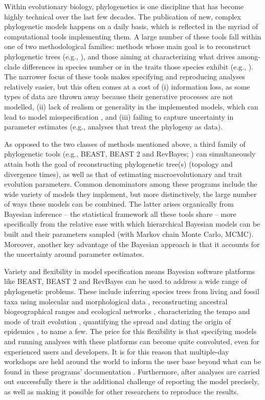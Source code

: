 \documentclass[10pt,letterpaper,table]{article}
\begin{document}
Within evolutionary biology, phylogenetics is one discipline that has
become highly technical over the last few decades.
The publication of new, complex phylogenetic models happens on a
daily basis, which is reflected in the myriad of computational tools
implementing them.
A large number of these tools fall within one of two methodological
families: methods whose main goal is to reconstruct phylogenetic trees 
(e.g.,
\cite{mrbayes,mcmctree,mpest,phyml,svdquartets,raxml,iqtree,astral3,svdquest}),
and those aiming at characterizing what drives among-clade differences
 in species number or in the traits those species exhibit (e.g.,
\cite{diversitree,phytools,bamm,geiger,mvmorph,rpanda,bite,cafe}).
The narrower focus of these tools makes specifying and reproducing
analyses relatively easier, but this often comes at a cost of (i)
information loss, as some types of data are thrown away because their
generative processes are not modelled, (ii) lack of realism or
generality in the implemented models, which can lead to model
misspecification \cite{mendes17,mendes18}, and (iii) failing to
capture uncertainty in parameter estimates (e.g., analyses that treat
the phylogeny as data).

As opposed to the two classes of methods mentioned above, a third
family of phylogenetic tools (e.g., BEAST, BEAST 2 and RevBayes;
\cite{beast,beast2,revbayes}) can simultaneously attain both the goal
of reconstructing phylogenetic tree(s) (topology and divergence
times), as well as that of estimating macroevolutionary and trait
evolution parameters.
Common denominators among these programs include the wide variety of
models they implement, but more distinctively, the large number of
ways these models can be combined.
The latter arises organically from Bayesian inference -- the
statistical framework all these tools share -- more specifically from
the relative ease with which hierarchical Bayesian models can be 
built and their parameters sampled (with Markov chain Monte Carlo,
MCMC).
Moreover, another key advantage of the Bayesian approach is that it
accounts for the uncertainty around parameter estimates.

Variety and flexibility in model specification means Bayesian software
platforms like BEAST, BEAST 2 and RevBayes can be used to address a
wide range of phylogenetic problems. 
These include inferring species trees from living and fossil taxa
using molecular and morphological data
\cite{gavryushkina17,ogilvie21,zhang21}, reconstructing ancestral
biogeographical ranges \cite{lemey10,landis18} and ecological networks
\cite{braga20}, characterizing the tempo and mode of trait evolution
\cite{may19,bite}, quantifying the spread and dating the origin of
epidemics \cite{faria21,douglas21}, to name a few.
The price for this flexibility is that specifying models and running
analyses with these platforms can become quite convoluted,
even for experienced users and developers.
It is for this reason that multiple-day workshops are held around the
world to inform the user base beyond what can be found in these programs'
documentation \cite{taming,revworkshop}.
Furthermore, after analyses are carried out successfully there is the
additional challenge of reporting the model precisely, as well as
making it possible for other researchers to reproduce the results.
\end{document}
